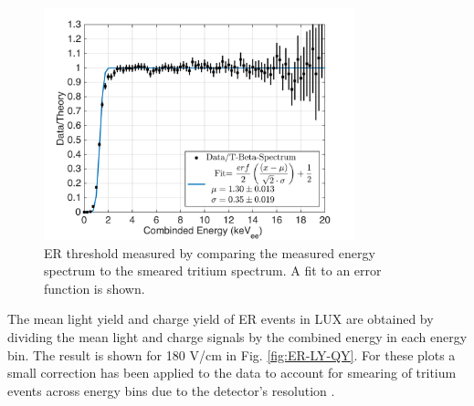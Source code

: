 \begin{figure}[h!]\centering
\includegraphics[width=90mm]{fig/E_Thres_Fit.png}
\caption{ER threshold measured by comparing the measured energy spectrum to the smeared tritium spectrum. A fit to an error function is shown.}
\label{fig:ER-threshold}
\end{figure}

The mean light yield and charge yield of ER events in LUX are obtained by dividing the mean light and charge signals by the combined energy in each energy bin. The result is shown for 180 V/cm in Fig. \ref{fig:ER-LY-QY}. For these plots a small correction has been applied to the data to account for smearing of tritium events across energy bins due to the detector's resolution \cite{attila-thesis}. 

